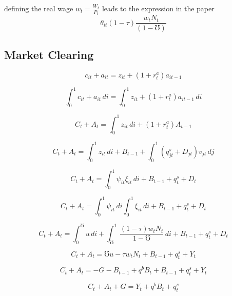 \documentclass[titlepage]{\econtex}\providecommand{\texname}{FBS-NK}
\begin{document}
defining the real wage $w_{t} = \frac{W_{t}}{P_{t}}$ leads to the expression in the paper \\

$$ \theta_{it}(1-\tau) \frac{w_{t}N_{t}}{(1-\mho)}$$



\hypertarget{Market Clearing}{}
\subsection{Market Clearing } 


$$ c_{it} + a_{it} = z_{it} + (1+r_{t}^{a})a_{it-1} $$

$$ \int_{0}^{1} c_{it} + a_{it} \, di = \int_{0}^{1} z_{it} + (1+r_{t}^{a})a_{it-1} \, di $$

$$ C_{t} + A_{t}= \int_{0}^{1} z_{it} \,di + (1+r_{t}^{a}) A_{t-1}  $$

$$ C_{t} + A_{t}= \int_{0}^{1} z_{it} \,di + B_{t-1} + \int_{0}^{1} (q^{s}_{jt} +D_{jt})v_{jt} \, dj  $$

$$ C_{t} + A_{t}= \int_{0}^{1} \psi_{it} \xi_{it} \,di + B_{t-1} + q^{s}_{t} +D_{t} $$

$$ C_{t} + A_{t}= \int_{0}^{1} \psi_{it}\,di \int_{0}^{1} \xi_{it} \,di + B_{t-1} + q^{s}_{t} +D_{t} $$

$$ C_{t} + A_{t}= \int_{0}^{\mho} u \,di + \int_{\mho}^{1} \frac{(1-\tau)w_{t}N_{t}}{1-\mho} \,di + B_{t-1} + q^{s}_{t} +D_{t} $$

$$ C_{t} + A_{t}= \mho u  -\tau w_{t}N_{t} + B_{t-1} + q^{s}_{t} +Y_{t}  $$

$$ C_{t} + A_{t}= -G - B_{t-1} + q^{b}B_{t} + B_{t-1} + q^{s}_{t} +Y_{t}  $$

$$ C_{t} + A_{t} +G=  Y_{t} + q^{b}B_{t}  + q^{s}_{t}   $$






%


\end{document}
